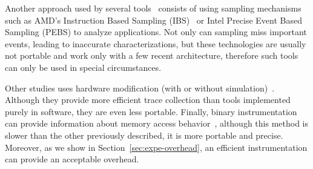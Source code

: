 Another approach used by several
tools~\cite{Lachaize12MemProf,McCurdy2010,Liu14Tool,Gimenez14Dissecting}
consists of using sampling mechanisms such as AMD's Instruction Based Sampling
(IBS)~\cite{Drongowski07Instructionbased} or Intel Precise Event Based
Sampling (PEBS) to analyze applications. Not only can sampling miss important events, leading to
inaccurate characterizations, but these technologies are usually not portable and work
only with a few recent architecture, therefore such tools can only be used in
special circumstances.

Other studies uses hardware modification (with or without simulation)~\cite{Bao08HMTT,Martonosi92MemSpy}.
Although they provide more efficient trace collection than tools implemented purely in software, they are even less portable.
Finally, binary instrumentation can provide information about memory access behavior~\cite{DeRose02SIGMA}, although this method is slower than
the other previously described, it is more portable and precise. Moreover, as
we show in Section~\ref{sec:expe-overhead}, an efficient instrumentation can
provide an acceptable overhead.
